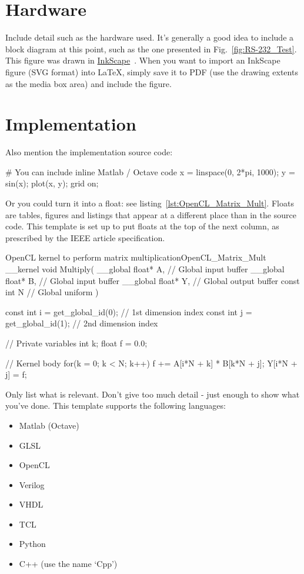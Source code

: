 

\section{Hardware}

Include detail such as the hardware used.  It's generally a good idea to include a block diagram at this point, such as the one presented in Fig.~\ref{fig:RS-232_Test}.  This figure was drawn in \href{http://www.inkscape.org/}{InkScape}~\cite{InkScape}.  When you want to import an InkScape figure (SVG format) into \LaTeX{}, simply save it to PDF (use the drawing extents as the media box area) and include the figure.


\section{Implementation}

Also mention the implementation source code:

\begin{Matlab}
	# You can include inline Matlab / Octave code
	x = linspace(0, 2*pi, 1000);
	y = sin(x);
	plot(x, y); grid on;
\end{Matlab}

Or you could turn it into a float: see listing~\ref{lst:OpenCL_Matrix_Mult}.  Floats are tables, figures and listings that appear at a different place than in the source code.  This template is set up to put floats at the top of the next column, as prescribed by the IEEE article specification.

\begin{OpenCL_float}{OpenCL kernel to perform matrix multiplication}{OpenCL_Matrix_Mult}
	__kernel void Multiply(
	__global float* A, // Global input buffer
	__global float* B, // Global input buffer
	__global float* Y, // Global output buffer
	const  int    N  // Global uniform
	){
		const int i = get_global_id(0); // 1st dimension index
		const int j = get_global_id(1); // 2nd dimension index
		
		// Private variables
		int   k;
		float f = 0.0;
		
		// Kernel body
		for(k = 0; k < N; k++) f += A[i*N + k] * B[k*N + j];
		Y[i*N + j] = f;
	}
\end{OpenCL_float}

Only list what is relevant.  Don't give too much detail - just enough to show what you've done.  This template supports the following languages:

\begin{itemize}
	\item Matlab (Octave)
	\item GLSL
	\item OpenCL
	\item Verilog
	\item VHDL
	\item TCL
	\item Python
	\item C++ (use the name `Cpp')
\end{itemize}

